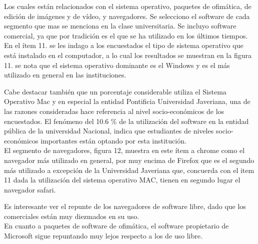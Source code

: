 \begin{multicols}{2}
Los cuales están relacionados con el sistema operativo, paquetes de ofimática, de edición de imágenes y de vídeo, y navegadores. Se selecciono el software de cada segmento que mas se menciona en la clase universitaria. Se incluyo software comercial, ya que por tradición es el que se ha utilizado en los últimos tiempos.\\

En el ítem 11. se les indago a los encuestados el tipo de sistema operativo que está instalado en el computador, a lo cual los resultados se muestran en la figura 11.  se nota que el sistema operativo dominante es el Windows y es el m\'as utilizado en general en las instituciones. \\

\begin{center}
\end{center}

Cabe destacar tambi\'en que un porcentaje considerable utiliza el  Sistema Operativo Mac y en especial la entidad  Pontificia Universidad Javeriana, una de las razones consideradas hace referencia al nivel socio-económicos de los encuestados. El fenómeno  del 10.6 \% de la utilización del software en la entidad pública de la universidad Nacional, indica que  estudiantes de niveles socio-económicos importantes están optando por esta institución.\\

El segmento de navegadores, figura 12,  muestra en este ítem a chrome como el navegador m\'as utilizado en general, por muy encima de Firefox que es el segundo m\'as utilizado a excepción de la Universidad Javeriana que, concuerda con el item 11 dada la utilización del sistema operativo MAC, tienen en segundo lugar el navegador safari.

\begin{center}
\end{center}

Es interesante ver el repunte de los navegadores de software libre, dado que los comerciales están muy diezmados en su uso.\\
En cuanto a paquetes de software de ofimática, el software propietario de Microsoft sigue repuntando muy lejos respecto a los de uso libre.

\begin{center}
\end{center}


\end{multicols}
